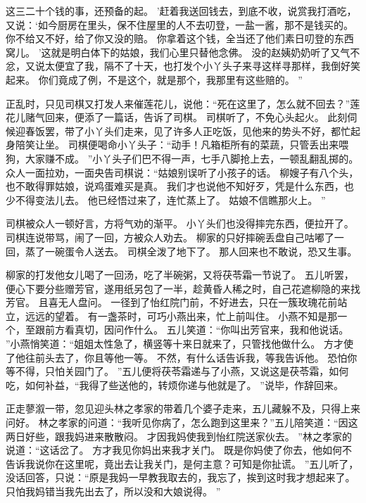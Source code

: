 这三二十个钱的事，还预备的起。
’赶着我送回钱去，到底不收，说赏我打酒吃，又说：‘如今厨房在里头，保不住屋里的人不去叨登，一盐一酱，那不是钱买的。
你不给又不好，给了你又没的赔。
你拿着这个钱，全当还了他们素日叨登的东西窝儿。
’这就是明白体下的姑娘，我们心里只替他念佛。
没的赵姨奶奶听了又气不忿，又说太便宜了我，隔不了十天，也打发个小丫头子来寻这样寻那样，我倒好笑起来。
你们竟成了例，不是这个，就是那个，我那里有这些赔的。
”\par
正乱时，只见司棋又打发人来催莲花儿，说他：“死在这里了，怎么就不回去？”莲花儿赌气回来，便添了一篇话，告诉了司棋。
司棋听了，不免心头起火。
此刻伺候迎春饭罢，带了小丫头们走来，见了许多人正吃饭，见他来的势头不好，都忙起身陪笑让坐。
司棋便喝命小丫头子：“动手！凡箱柜所有的菜蔬，只管丢出来喂狗，大家赚不成。
”小丫头子们巴不得一声，七手八脚抢上去，一顿乱翻乱掷的。
众人一面拉劝，一面央告司棋说：“姑娘别误听了小孩子的话。
柳嫂子有八个头，也不敢得罪姑娘，说鸡蛋难买是真。
我们才也说他不知好歹，凭是什么东西，也少不得变法儿去。
他已经悟过来了，连忙蒸上了。
姑娘不信瞧那火上。
”\par
司棋被众人一顿好言，方将气劝的渐平。
小丫头们也没得摔完东西，便拉开了。
司棋连说带骂，闹了一回，方被众人劝去。
柳家的只好摔碗丢盘自己咕嘟了一回，蒸了一碗蛋令人送去。
司棋全泼了地下了。
那人回来也不敢说，恐又生事。
\par
柳家的打发他女儿喝了一回汤，吃了半碗粥，又将茯苓霜一节说了。
五儿听罢，便心下要分些赠芳官，遂用纸另包了一半，趁黄昏人稀之时，自己花遮柳隐的来找芳官。
且喜无人盘问。
一径到了怡红院门前，不好进去，只在一簇玫瑰花前站立，远远的望着。
有一盏茶时，可巧小燕出来，忙上前叫住。
小燕不知是那一个，至跟前方看真切，因问作什么。
五儿笑道：“你叫出芳官来，我和他说话。
”小燕悄笑道：“姐姐太性急了，横竖等十来日就来了，只管找他做什么。
方才使了他往前头去了，你且等他一等。
不然，有什么话告诉我，等我告诉他。
恐怕你等不得，只怕关园门了。
”五儿便将茯苓霜递与了小燕，又说这是茯苓霜，如何吃，如何补益，“我得了些送他的，转烦你递与他就是了。
”说毕，作辞回来。
\par
正走蓼溆一带，忽见迎头林之孝家的带着几个婆子走来，五儿藏躲不及，只得上来问好。
林之孝家的问道：“我听见你病了，怎么跑到这里来？”五儿陪笑道：“因这两日好些，跟我妈进来散散闷。
才因我妈使我到怡红院送家伙去。
”林之孝家的说道：“这话岔了。
方才我见你妈出来我才关门。
既是你妈使了你去，他如何不告诉我说你在这里呢，竟出去让我关门，是何主意？可知是你扯谎。
”五儿听了，没话回答，只说：“原是我妈一早教我取去的，我忘了，挨到这时我才想起来了。
只怕我妈错当我先出去了，所以没和大娘说得。
”\par

